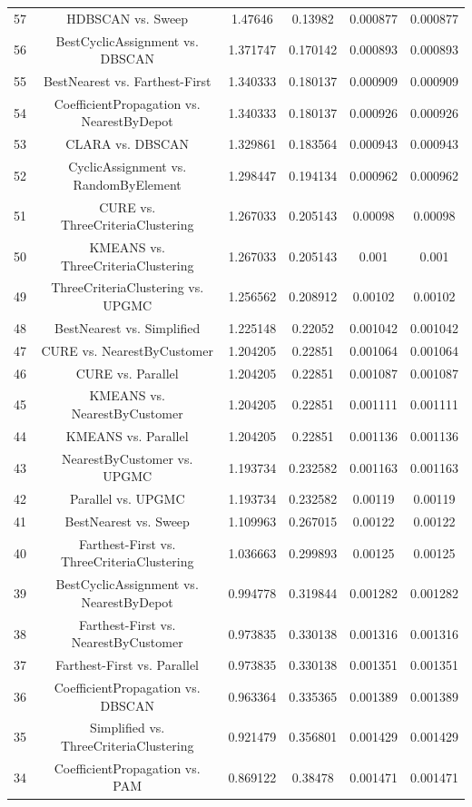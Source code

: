 \documentclass[a4paper,10pt]{article}
\begin{document}
\begin{landscape}
\begin{table}[!htp]
\begin{tabular}{cccccc}
57&HDBSCAN vs. Sweep&1.47646&0.13982&0.000877&0.000877\\
56&BestCyclicAssignment vs. DBSCAN&1.371747&0.170142&0.000893&0.000893\\
55&BestNearest vs. Farthest-First&1.340333&0.180137&0.000909&0.000909\\
54&CoefficientPropagation vs. NearestByDepot&1.340333&0.180137&0.000926&0.000926\\
53&CLARA vs. DBSCAN&1.329861&0.183564&0.000943&0.000943\\
52&CyclicAssignment vs. RandomByElement&1.298447&0.194134&0.000962&0.000962\\
51&CURE vs. ThreeCriteriaClustering&1.267033&0.205143&0.00098&0.00098\\
50&KMEANS vs. ThreeCriteriaClustering&1.267033&0.205143&0.001&0.001\\
49&ThreeCriteriaClustering vs. UPGMC&1.256562&0.208912&0.00102&0.00102\\
48&BestNearest vs. Simplified&1.225148&0.22052&0.001042&0.001042\\
47&CURE vs. NearestByCustomer&1.204205&0.22851&0.001064&0.001064\\
46&CURE vs. Parallel&1.204205&0.22851&0.001087&0.001087\\
45&KMEANS vs. NearestByCustomer&1.204205&0.22851&0.001111&0.001111\\
44&KMEANS vs. Parallel&1.204205&0.22851&0.001136&0.001136\\
43&NearestByCustomer vs. UPGMC&1.193734&0.232582&0.001163&0.001163\\
42&Parallel vs. UPGMC&1.193734&0.232582&0.00119&0.00119\\
41&BestNearest vs. Sweep&1.109963&0.267015&0.00122&0.00122\\
40&Farthest-First vs. ThreeCriteriaClustering&1.036663&0.299893&0.00125&0.00125\\
39&BestCyclicAssignment vs. NearestByDepot&0.994778&0.319844&0.001282&0.001282\\
38&Farthest-First vs. NearestByCustomer&0.973835&0.330138&0.001316&0.001316\\
37&Farthest-First vs. Parallel&0.973835&0.330138&0.001351&0.001351\\
36&CoefficientPropagation vs. DBSCAN&0.963364&0.335365&0.001389&0.001389\\
35&Simplified vs. ThreeCriteriaClustering&0.921479&0.356801&0.001429&0.001429\\
34&CoefficientPropagation vs. PAM&0.869122&0.38478&0.001471&0.001471\\

\end{tabular}
\end{table}
\end{landscape}
\end{document}
